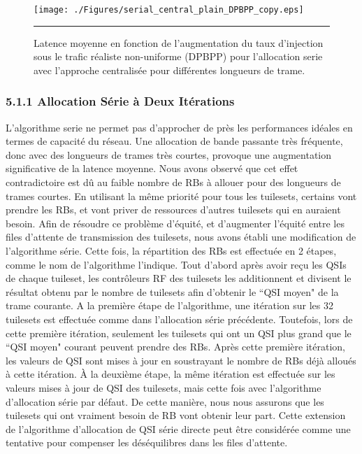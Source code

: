 \begin{figure}[htbp]
  \centering
    \texttt{[image: ./Figures/serial\_central\_plain\_DPBPP\_copy.eps]}
    \rule{35em}{0.5pt}
  \caption[Latence moyenne avec l'augmentation du taux d'injection sous le trafic réaliste non-uniforme (DPBPP) pour l'allocation serielle avec l'approche centralisée pour différentes longueurs de trame.]{Latence moyenne en fonction de l'augmentation du taux d'injection sous le trafic réaliste non-uniforme (DPBPP) pour l'allocation serie avec l'approche centralisée pour différentes longueurs de trame.}
  \label{fig:Electron}
\end{figure}

\subsubsection*{5.1.1 Allocation Série à Deux Itérations}

L'algorithme serie ne permet pas d’approcher de près les performances idéales en termes de capacité du réseau. Une allocation de bande passante très fréquente, donc avec des longueurs de trames très courtes, provoque une augmentation significative de la latence moyenne. Nous avons observé que cet effet contradictoire est dû au faible nombre de RBs à allouer pour des longueurs de trames courtes. En utilisant la même priorité pour tous les tuilesets, certains vont prendre les RBs, et vont priver de ressources d’autres tuilesets qui en auraient besoin. Afin de résoudre ce problème d'équité, et d'augmenter l'équité entre les files d'attente de transmission des tuilesets, nous avons établi une modification de l'algorithme série. Cette fois, la répartition des RBs est effectuée en 2 étapes, comme le nom de l’algorithme l'indique. Tout d'abord après avoir reçu les QSIs de chaque tuileset, les contrôleurs RF des tuilesets les additionnent et divisent le résultat obtenu par le nombre de tuilesets afin d’obtenir le ``QSI moyen" de la trame courante. A la première étape de l'algorithme, une itération sur les 32 tuilesets est effectuée comme dans l'allocation série précédente. Toutefois, lors de cette première itération, seulement les tuilesets qui ont un QSI plus grand que le ``QSI moyen" courant peuvent prendre des RBs. Après cette première itération, les valeurs de QSI sont mises à jour en soustrayant le nombre de RBs déjà alloués à cette itération. À la deuxième étape, la même itération est effectuée sur les valeurs mises à jour de QSI des tuilesets, mais cette fois avec l'algorithme d'allocation série par défaut. De cette manière, nous nous assurons que les tuilesets qui ont vraiment besoin de RB vont obtenir leur part. Cette extension de l’algorithme d'allocation de QSI série directe peut être considérée comme une tentative pour compenser les déséquilibres dans les files d'attente.

